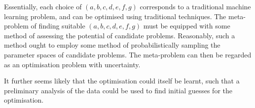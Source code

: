 Essentially, each choice of $(a, b, c, d, e, f, g)$ corresponds to a traditional machine learning problem, and can be optimised using traditional techniques. The meta-problem of finding suitable $(a, b, c, d, e, f, g)$ must be equipped with some method of assessing the potential of candidate problems. Reasonably, such a method ought to employ some method of probabilistically sampling the parameter spaces of candidate problems. The meta-problem can then be regarded as an optimisation problem with uncertainty.

It further seems likely that the optimisation could itself be learnt, such that a preliminary analysis of the data could be used to find initial guesses for the optimisation.
